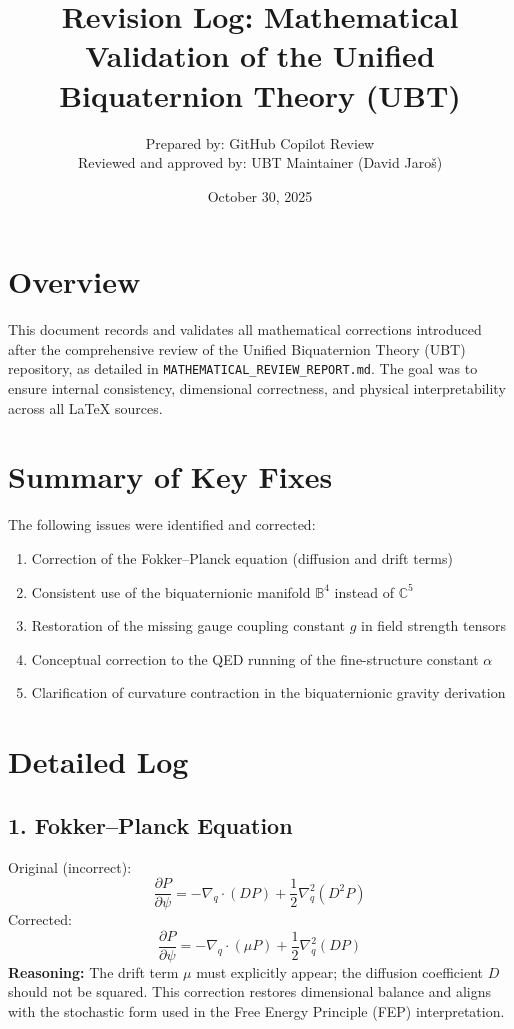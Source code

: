 \documentclass[12pt]{article}
\begin{document}
\title{\textbf{Revision Log: Mathematical Validation of the Unified Biquaternion Theory (UBT)}}
\author{Prepared by: GitHub Copilot Review \\ Reviewed and approved by: UBT Maintainer (David Jaroš)}
\date{October 30, 2025}
\maketitle

\section*{Overview}
This document records and validates all mathematical corrections introduced after the comprehensive review of the Unified Biquaternion Theory (UBT) repository, as detailed in \texttt{MATHEMATICAL\_REVIEW\_REPORT.md}.  
The goal was to ensure internal consistency, dimensional correctness, and physical interpretability across all LaTeX sources.

\section*{Summary of Key Fixes}
The following issues were identified and corrected:
\begin{enumerate}
    \item Correction of the Fokker–Planck equation (diffusion and drift terms)
    \item Consistent use of the biquaternionic manifold $\mathbb{B}^4$ instead of $\mathbb{C}^5$
    \item Restoration of the missing gauge coupling constant $g$ in field strength tensors
    \item Conceptual correction to the QED running of the fine-structure constant $\alpha$
    \item Clarification of curvature contraction in the biquaternionic gravity derivation
\end{enumerate}

\section*{Detailed Log}

\subsection*{1. Fokker–Planck Equation}
Original (incorrect):
\[
\frac{\partial P}{\partial \psi} = -\nabla_q \cdot (D P) + \frac{1}{2} \nabla_q^2 (D^2 P)
\]
Corrected:
\[
\frac{\partial P}{\partial \psi} = -\nabla_q \cdot (\mu P) + \frac{1}{2} \nabla_q^2 (D P)
\]
\textbf{Reasoning:} The drift term $\mu$ must explicitly appear; the diffusion coefficient $D$ should not be squared.  
This correction restores dimensional balance and aligns with the stochastic form used in the Free Energy Principle (FEP) interpretation.
\end{document}
